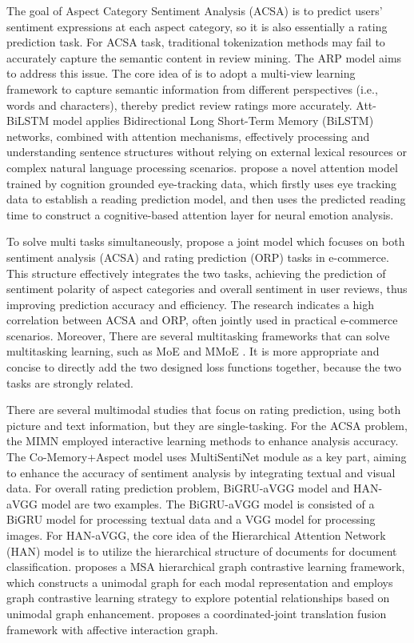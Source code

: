 \documentclass[preprint,12pt]{elsarticle}
\begin{document}
The goal of Aspect Category Sentiment Analysis (ACSA) is to predict users' sentiment expressions at each aspect category, so it is also essentially a rating prediction task. For ACSA task, traditional tokenization methods may fail to accurately capture the semantic content in review mining. The ARP model \citep{wu2019arp} aims to address this issue. The core idea of is to adopt a multi-view learning framework to capture semantic information from different perspectives (i.e., words and characters), thereby predict review ratings more accurately. Att-BiLSTM \citep{zhou2016attention} model applies Bidirectional Long Short-Term Memory (BiLSTM) networks, combined with attention mechanisms, effectively processing and understanding sentence structures without relying on external lexical resources or complex natural language processing scenarios. \citet{long2017cognition} propose a novel attention model trained by cognition grounded eye-tracking data, which firstly uses eye tracking data to establish a reading prediction model, and then uses the predicted reading time to construct a cognitive-based attention layer for neural emotion analysis.

To solve multi tasks simultaneously, \citet{bu2021asap} propose a joint model which focuses on both sentiment analysis (ACSA) and rating prediction (ORP) tasks in e-commerce. This structure effectively integrates the two tasks, achieving the prediction of sentiment polarity of aspect categories and overall sentiment in user reviews, thus improving prediction accuracy and efficiency. The research indicates a high correlation between ACSA and ORP, often jointly used in practical e-commerce scenarios. Moreover, There are several multitasking frameworks that can solve multitasking learning, such as MoE \citep{jacobs1991adaptive} and MMoE \citep{ma2018modeling}. It is more appropriate and concise to directly add the two designed loss functions together, because the two tasks are strongly related.

There are several multimodal studies that focus on rating prediction, using both picture and text information, but they are single-tasking. For the ACSA problem, the MIMN \citep{xu2019multi} employed interactive learning methods to enhance analysis accuracy. The Co-Memory+Aspect \citep{xu2017multisentinet} model uses MultiSentiNet module as a key part, aiming to enhance the accuracy of sentiment analysis by integrating textual and visual data. For overall rating prediction problem, BiGRU-aVGG model \citep{tang2015document} and HAN-aVGG \citep{yang2016hierarchical} model are two examples. The BiGRU-aVGG model is consisted of a BiGRU model for processing textual data and a VGG model for processing images. For HAN-aVGG, the core idea of the Hierarchical Attention Network (HAN) model is to utilize the hierarchical structure of documents for document classification. \citet{lin2022modeling} proposes a MSA hierarchical graph contrastive learning framework, which constructs a unimodal graph for each modal representation and employs graph contrastive learning strategy to explore potential relationships based on unimodal graph enhancement. \citet{Lu2024coordinated} proposes a coordinated-joint translation fusion framework with affective interaction graph. 
\end{document}

